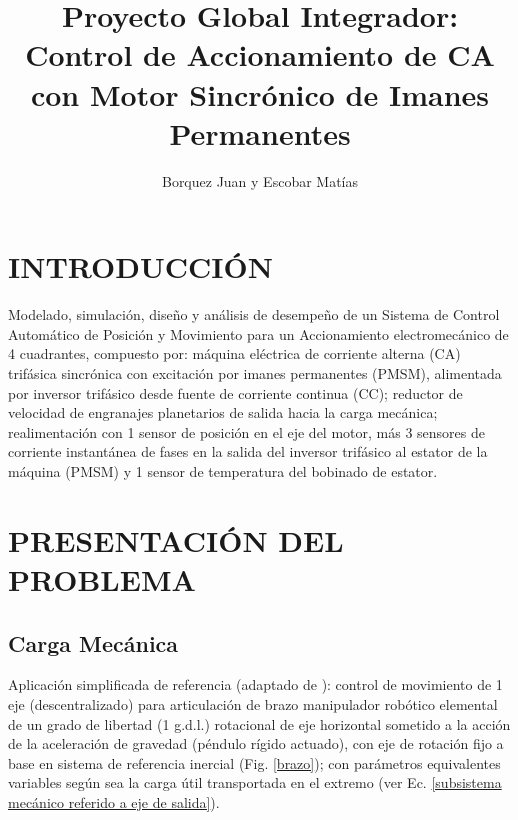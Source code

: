 \documentclass[a4paper, 10pt, onecolumn,journal]{ieeeconf}
\title{\LARGE \bf
Proyecto Global Integrador: Control de Accionamiento de CA con
Motor Sincrónico de Imanes Permanentes
}
\author{Borquez Juan y Escobar Matías}
\begin{document}
\maketitle
\thispagestyle{empty}
\pagestyle{fancy}

\begin{abstract}
\end{abstract}

\section{INTRODUCCIÓN}
Modelado, simulación, diseño y análisis de desempeño de un Sistema de Control Automático de Posición y Movimiento para un Accionamiento electromecánico de 4 cuadrantes, compuesto por: máquina eléctrica de corriente alterna (CA) trifásica sincrónica con excitación por imanes permanentes (PMSM), alimentada por inversor trifásico desde fuente de corriente continua (CC); reductor de velocidad de engranajes planetarios de salida hacia la carga mecánica; realimentación con 1 sensor de posición en el eje del motor, más 3 sensores de corriente instantánea de fases en la salida del inversor trifásico al estator de la máquina (PMSM) y 1 sensor de temperatura del bobinado de estator.


\section{PRESENTACIÓN DEL PROBLEMA}
\subsection{\textbf{Carga Mecánica}}
Aplicación simplificada de referencia (adaptado de \cite{c1}): control de movimiento de 1 eje (descentralizado) para articulación de brazo manipulador robótico elemental de un grado de libertad (1 g.d.l.) rotacional de eje horizontal sometido a la acción de la aceleración de gravedad (péndulo rígido actuado), con eje de rotación fijo a base en sistema de referencia inercial (Fig. \ref{brazo}); con parámetros equivalentes variables según sea la carga útil transportada en el extremo (ver Ec. \ref{subsistema mecánico referido a eje de salida}).
\end{document}
